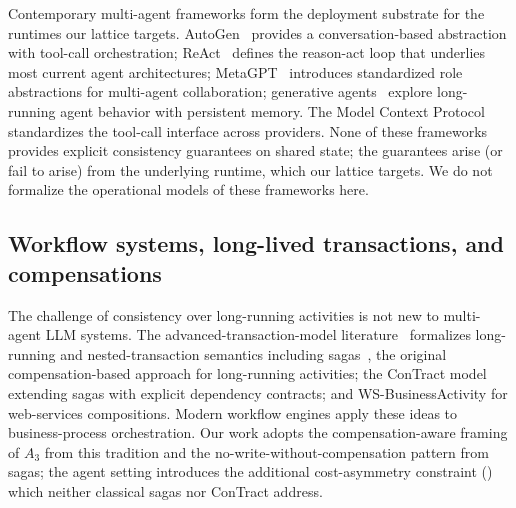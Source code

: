 \documentclass[journal,compsoc,10pt]{IEEEtran}
\providecommand{\citep}{\cite}
\theoremstyle{definition}
\theoremstyle{remark}
\begin{document}
Contemporary multi-agent frameworks form the deployment substrate
for the runtimes our lattice targets.
AutoGen~\citep{WuEtAl2023AutoGen} provides a conversation-based
abstraction with tool-call orchestration;
ReAct~\citep{YaoEtAl2022ReAct} defines the reason-act loop that
underlies most current agent architectures;
MetaGPT~\citep{HongEtAl2023MetaGPT} introduces standardized role
abstractions for multi-agent collaboration; generative
agents~\citep{ParkEtAl2023Generative} explore long-running agent
behavior with persistent memory. The Model Context
Protocol~\citep{AnthropicMCP2024} standardizes the tool-call
interface across providers. None of these frameworks provides
explicit consistency guarantees on shared state; the guarantees
arise (or fail to arise) from the underlying runtime, which our
lattice targets. We do not formalize the operational models of
these frameworks here.

\subsection{Workflow systems, long-lived transactions, and compensations}
\label{sec:related-workflows}
The challenge of consistency over long-running activities is not
new to multi-agent LLM systems. The advanced-transaction-model
literature~\citep{ElmagarmidEtAl1992ATM,ChrysanthisRamamritham1994ACTA}
formalizes long-running and nested-transaction semantics including
sagas~\citep{GarciaMolinaSalem1987Sagas}, the original
compensation-based approach for long-running activities; the
ConTract model~\citep{ReuterWachter1991ConTract} extending sagas
with explicit dependency contracts; and WS-BusinessActivity for
web-services compositions. Modern workflow engines apply these
ideas to business-process orchestration. Our work adopts the
compensation-aware framing of $A_3$ from this tradition and the
no-write-without-compensation pattern from sagas; the agent
setting introduces the additional cost-asymmetry constraint
() which neither classical sagas nor
ConTract address.
\end{document}
